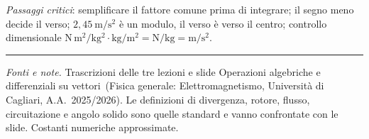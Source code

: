 \documentclass[11pt,a4paper]{article}
\newcommand{\unit}[1]{\ \mathrm{#1}}
\begin{document}
\emph{Passaggi critici}: semplificare il fattore comune prima di integrare; il segno meno decide il verso; $2{,}45\unit{m/s^2}$ è un modulo, il verso è verso il centro; controllo dimensionale $\mathrm{N\,m^2/kg^2\cdot kg/m^2=N/kg=m/s^2}$.

\bigskip\hrule\medskip
\small\emph{Fonti e note.} Trascrizioni delle tre lezioni e slide \guillemotleft Operazioni algebriche e differenziali su vettori\guillemotright\ (Fisica generale: Elettromagnetismo, Università di Cagliari, A.A.\ 2025/2026). Le definizioni di divergenza, rotore, flusso, circuitazione e angolo solido sono quelle standard e vanno confrontate con le slide. Costanti numeriche approssimate.
\end{document}

